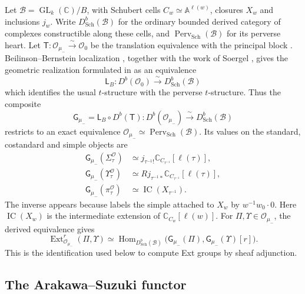 \documentclass[10pt,a4paper]{article}
\theoremstyle{definition}
\theoremstyle{remark}
\numberwithin{equation}{section}
\newcommand{\CC}{\mathbb{C}}
\DeclareMathOperator{\Hom}{Hom}
\DeclareMathOperator{\Ext}{Ext}
\DeclareMathOperator{\GL}{GL}
\begin{document}
Let $\mathcal B=\GL_k(\CC)/B$, with Schubert cells
$C_w\simeq\mathbb A^{\ell(w)}$, closures $X_w$ and inclusions $j_w$.
Write $D^b_{\mathrm{Sch}}(\mathcal B)$ for the ordinary bounded derived
category of complexes constructible along these cells, and
$\operatorname{Perv}_{\mathrm{Sch}}(\mathcal B)$ for its perverse heart.
Let $\mathsf T:\mathcal O_{\mu_-}\xrightarrow{\sim}\mathcal O_0$
be the translation equivalence with the principal block
\cite[\S7.1 and the theorem in \S7.8]{Humphreys2008}.
Beilinson--Bernstein localization \cite{BB1981}, together with the
work of Soergel \cite{Soergel1986,Soergel1989}, gives the geometric
realization formulated in \cite[Proposition~3.5.2]{BGS1996} as an equivalence
\[
 \mathsf L_B:D^b(\mathcal O_0)
       \xrightarrow{\ \sim\ }D^b_{\mathrm{Sch}}(\mathcal B)
\]
which identifies the usual $t$-structure with the perverse
$t$-structure. Thus the composite
\[
 \mathsf G_{\mu_-}=\mathsf L_B\circ D^b(\mathsf T):
 D^b(\mathcal O_{\mu_-})
       \xrightarrow{\ \sim\ }D^b_{\mathrm{Sch}}(\mathcal B)
\]
restricts to an exact equivalence
$\mathcal O_{\mu_-}\simeq\operatorname{Perv}_{\mathrm{Sch}}(\mathcal B)$.
Its values on the standard, costandard and simple objects are
\cite[Propositions~3.5.2 and~3.5.7]{BGS1996}
\[
 \begin{aligned}
 \mathsf G_{\mu_-}(\Sigma_\tau^{\mathcal O})
   &\simeq
      j_{\tau^{-1}!}\CC_{C_{\tau^{-1}}}[\ell(\tau)],\\
 \mathsf G_{\mu_-}(\Upsilon_\tau^{\mathcal O})
   &\simeq
      Rj_{\tau^{-1}*}\CC_{C_{\tau^{-1}}}[\ell(\tau)],\\
 \mathsf G_{\mu_-}(\pi_\tau^{\mathcal O})
   &\simeq \operatorname{IC}(X_{\tau^{-1}}).
 \end{aligned}
\]
The inverse appears because \cite[\S1.1]{BGS1996} labels the simple
attached to $X_w$ by $w^{-1}w_0\mathbin{\cdot}0$.
Here $\operatorname{IC}(X_w)$ is the intermediate extension of
$\CC_{C_w}[\ell(w)]$. For $\Pi,\Upsilon\in\mathcal O_{\mu_-}$,
the derived equivalence gives
\[
 \Ext^r_{\mathcal O_{\mu_-}}(\Pi,\Upsilon)
 \simeq\Hom_{D^b_{\mathrm{Sch}}(\mathcal B)}
 \bigl(\mathsf G_{\mu_-}(\Pi),\mathsf G_{\mu_-}(\Upsilon)[r]\bigr).
\]
This is the identification used below to compute Ext groups by
sheaf adjunction.

\subsection{The Arakawa--Suzuki functor}\label{prelim:arakawa-suzuki}
\end{document}
